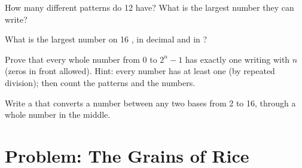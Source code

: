 \begin{exercise}[$\star\star$]\label{exo:g8:binary-and-hexadecimal:9}
How many different patterns do 12  have? What is the largest number they
can write?
\end{exercise}

\begin{exercise}[$\star\star\star$]\label{exo:g8:binary-and-hexadecimal:10}
What is the largest number on 16 , in decimal and in ?
\end{exercise}

\begin{exercise}[$\star\star\star$]\label{exo:g8:binary-and-hexadecimal:11}
Prove that every whole number from 0 to $2^n - 1$ has exactly one writing
with $n$  (zeros in front allowed). Hint: every number has at least one
(by repeated division); then count the patterns and the numbers.
\end{exercise}

\begin{exercise}[$\star\star\star$]\label{exo:g8:binary-and-hexadecimal:12}
Write a   that converts a
number between any two bases from 2 to 16, through a whole number in the
middle.
\end{exercise}

\section{Problem: The Grains of Rice}

